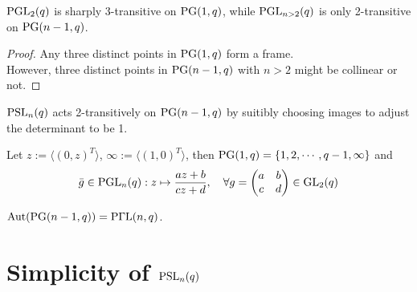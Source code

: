 \documentclass[a4paper,11pt]{article}
\def\subtitle#1{\section{#1}}
\begin{document}
\begin{proposition}
    $\mathrm{PGL}_2(q)$ is sharply 3-transitive on $\mathrm{PG}(1,q)$, while $\mathrm{PGL}_{n>2}(q)$ is only 2-transitive on $\mathrm{PG}(n-1,q)$. 
\end{proposition}
\begin{proof}
    Any three distinct points in $\mathrm{PG}(1,q)$ form a frame. \\However, three distinct points in $\mathrm{PG}(n-1, q)$ with $n > 2$ might be collinear or not.
\end{proof}

\begin{corollary}\label{primitive action}
    $\mathrm{PSL}_n(q)$ acts 2-transitively on $\mathrm{PG}(n-1,q)$ by suitibly choosing images to adjust the determinant to be 1.
\end{corollary}

\begin{remark}
    Let $z:=\langle (0,z)^T\rangle$, $\infty:=\langle (1,0)^T\rangle$, then $\mathrm{PG}(1,q)=\{1,2,\cdots,q-1,\infty\}$ and
    \begin{equation*}
        \bar{g}\in\mathrm{PGL}_n(q): z\mapsto \frac{az+b}{cz+d}, \quad \forall g=
        \begin{pmatrix}
            a & b\\
            c & d
        \end{pmatrix}\in \mathrm{GL}_2(q) 
    \end{equation*}
\end{remark}


\begin{theorem}
    $\mathrm{Aut}(\mathrm{PG}(n-1,q))=\mathrm{P\Gamma L}(n,q)$. 
\end{theorem}



\subtitle{Simplicity of $\mathrm{PSL}_n(q)$}
\end{document}
